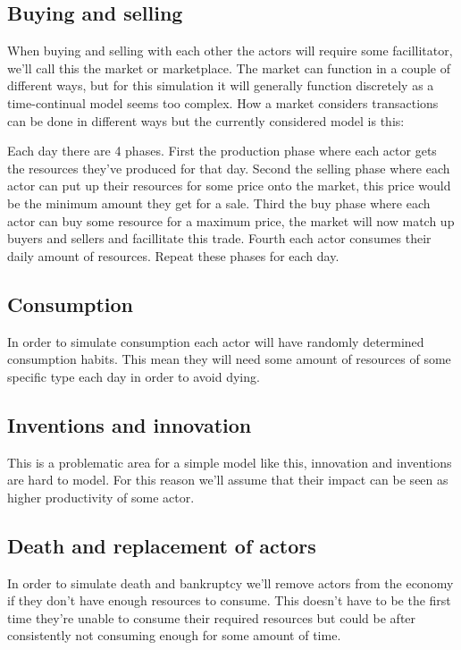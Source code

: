 \documentclass[11p]{article}
\begin{document}
\subsection{Buying and selling}
When buying and selling with each other the actors will require some facillitator, we'll call this the market or marketplace. The market can function in a couple of different ways, but for this simulation it will generally function discretely as a time-continual model seems too complex.
How a market considers transactions can be done in different ways but the currently considered model is this:

Each day there are 4 phases.
First the production phase where each actor gets the resources they've produced for that day.
Second the selling phase where each actor can put up their resources for some price onto the market, this price would be the minimum amount they get for a sale.
Third the buy phase where each actor can buy some resource for a maximum price, the market will now match up buyers and sellers and facillitate this trade.
Fourth each actor consumes their daily amount of resources.
Repeat these phases for each day.

\subsection{Consumption}
In order to simulate consumption each actor will have randomly determined consumption habits. This mean they will need some amount of resources of some specific type each day in order to avoid dying.

\subsection{Inventions and innovation}
This is a problematic area for a simple model like this, innovation and inventions are hard to model. For this reason we'll assume that their impact can be seen as higher productivity of some actor.

\subsection{Death and replacement of actors}
In order to simulate death and bankruptcy we'll remove actors from the economy if they don't have enough resources to consume. This doesn't have to be the first time they're unable to consume their required resources but could be after consistently not consuming enough for some amount of time.
\end{document}
